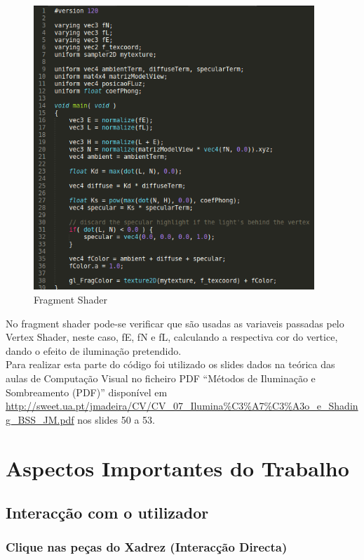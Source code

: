 \documentclass[11pt,a4paper]{report}
\begin{document}
\begin{figure}[H]
\centerline{\includegraphics[width=300pt]{images/fragmentshader.png}}
\caption{Fragment Shader}
\label{img:complete}
\end{figure}

No fragment shader pode-se verificar que são usadas as variaveis passadas pelo Vertex Shader, neste caso, fE, fN e fL, calculando a respectiva cor do vertice, dando o efeito de iluminação pretendido.\\

Para realizar esta parte do código foi utilizado os slides dados na teórica das aulas de Computação Visual no ficheiro PDF ``Métodos de Iluminação e Sombreamento (PDF)'' disponível em \url{http://sweet.ua.pt/jmadeira/CV/CV_07_Ilumina%C3%A7%C3%A3o_e_Shading_BSS_JM.pdf} nos slides 50 a 53.

\chapter{Aspectos Importantes do Trabalho}

\section{Interacção com o utilizador}

\subsection{Clique nas peças do Xadrez (Interacção Directa)}
\end{document}
